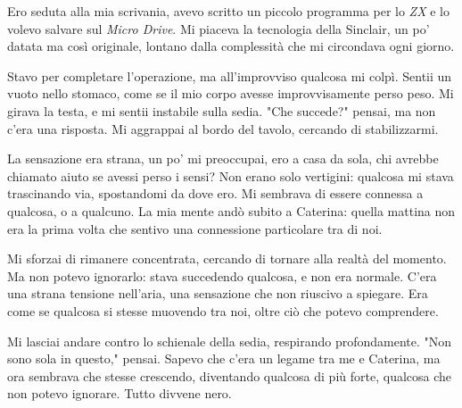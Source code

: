 Ero seduta alla mia scrivania, avevo scritto un piccolo programma per  lo \emph{ZX}  e lo volevo salvare sul \emph{Micro Drive}.  Mi piaceva la tecnologia della Sinclair, un po' datata ma così originale, lontano dalla complessità che mi circondava ogni giorno.

Stavo per completare l’operazione, ma all’improvviso qualcosa mi colpì. Sentii un vuoto nello stomaco, come se il mio corpo avesse improvvisamente perso peso. Mi girava la testa, e mi sentii instabile sulla sedia. "Che succede?" pensai, ma non c’era una risposta. Mi aggrappai al bordo del tavolo, cercando di stabilizzarmi.

La sensazione era strana, un po' mi preoccupai, ero a casa da sola, chi avrebbe chiamato aiuto se avessi perso i sensi? Non erano solo vertigini: qualcosa mi stava trascinando via, spostandomi da dove ero. Mi sembrava di essere connessa a qualcosa, o a qualcuno. La mia mente andò subito a Caterina: quella mattina non era la prima volta che sentivo una connessione particolare tra di noi.

Mi sforzai di rimanere concentrata, cercando di tornare alla realtà del momento. Ma non potevo ignorarlo: stava succedendo qualcosa, e non era normale. C’era una strana tensione nell’aria, una sensazione che non riuscivo a spiegare. Era come se qualcosa si stesse muovendo tra noi, oltre ciò che potevo comprendere.

Mi lasciai andare contro lo schienale della sedia, respirando profondamente. "Non sono sola in questo," pensai. Sapevo che c’era un legame tra me e Caterina, ma ora sembrava che stesse crescendo, diventando qualcosa di più forte, qualcosa che non potevo ignorare. Tutto divvene nero.



